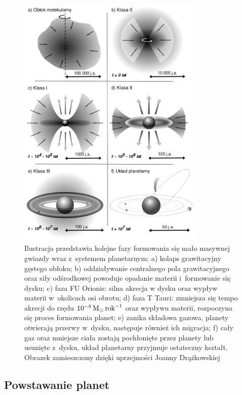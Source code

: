 \begin{figure}[p]
\centering 
\includegraphics[width=0.8\textwidth]{figures/planetformation.png}
\caption[Fazy formowania się mało masywnych gwiazd.]
   {Ilustracja przedstawia kolejne fazy formowania się mało masywnej gwiazdy
   wraz z~systemem planetarnym: a) kolaps grawitacyjny gęstego obłoku; b)
   oddziaływanie centralnego pola grawitacyjnego oraz siły odśrodkowej powoduje
   opadanie materii i~formowanie się dysku; c) faza FU Orionis: silna akrecja w
   dysku oraz wypływ materii w~okolicach osi obrotu; d) faza T Tauri: zmniejsza
   się tempo akrecji do rzędu $10^{-8}\hbox{$\mathrm{\thinspace M_{\odot}}$}\hbox{$\thinspace\textrm{rok}$}^{-1}$ oraz wypływu materii,
   rozpoczyna się proces formowania planet; e) zanika składowa gazowa, planety
otwierają przerwy w~dysku, następuje również ich migracja; f) cały gaz oraz
mniejsze ciała zostają pochłonięte przez planety lub usunięte z~dysku, układ
planetarny przyjmuje ostateczny kształt. Obrazek zamieszczony dzięki uprzejmości
Joanny Drążkowskiej}

\label{fig:planet}
\end{figure}

\subsection{Powstawanie planet}

